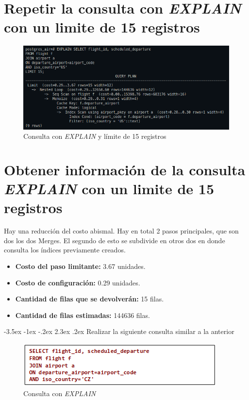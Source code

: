 \documentclass[11pt]{report}
\makeatletter
\renewcommand\chapter{\@startsection{chapter}{0}{\z@}%
    {-3.5ex \@plus -1ex \@minus -.2ex}%
    {2.3ex \@plus.2ex}%
    {\normalfont\Large\bfseries}}
\makeatother
\begin{document}
\section{Repetir la consulta con \emph{EXPLAIN} con un limite de 15 registros}
\begin{figure}[H]
  \centering
  \includegraphics[scale=0.55]{img/consulta_explain_limit_US.png}
  \caption{Consulta con \emph{EXPLAIN} y límite de 15 registros}
  \label{fig:consulta con EXPLAIN y límite de 15 registros}
\end{figure}

\section{Obtener información de la consulta \emph{EXPLAIN} con un limite de 15 registros}
Hay una reducción del costo abismal. Hay en total 2 pasos principales, que son dos los
dos Merges. El segundo de esto se subdivide en otros dos en donde consulta los índices
previamente creados.

\begin{itemize}
  \item \textbf{Costo del paso limitante:} 3.67 unidades.
  \item \textbf{Costo de configuración:}  0.29 unidades.
  \item \textbf{Cantidad de filas que se devolverán:} 15 filas.
  \item \textbf{Cantidad de filas estimadas:} 144636 filas.
\end{itemize}

\cleardoublepage

\chapter{Realizar la siguiente consulta similar a la anterior}
\begin{figure}[H]
  \centering
  \includegraphics[scale=0.8]{img/consulta_CZ.png}
  \caption{Consulta con \emph{EXPLAIN}}
  \label{fig:consulta con EXPLAIN 2}
\end{figure}
\end{document}
